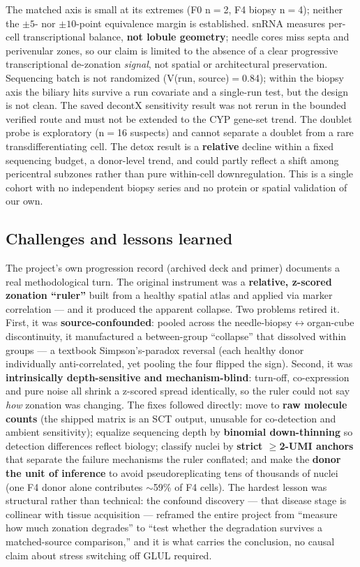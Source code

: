 \documentclass[11pt,a4paper]{article}
\begin{document}
The matched axis is small at its extremes (F0 n$=$2, F4 biopsy n$=$4); neither the $\pm5$- nor $\pm10$-point equivalence margin is established. snRNA measures per-cell transcriptional balance, \textbf{not lobule geometry}; needle cores miss septa and perivenular zones, so our claim is limited to the absence of a clear progressive transcriptional de-zonation \emph{signal}, not spatial or architectural preservation. Sequencing batch is not randomized (V(run, source)$=$0.84); within the biopsy axis the biliary hits survive a run covariate and a single-run test, but the design is not clean. The saved decontX sensitivity result was not rerun in the bounded verified route and must not be extended to the CYP gene-set trend. The doublet probe is exploratory (n$=$16 suspects) and cannot separate a doublet from a rare transdifferentiating cell. The detox result is a \textbf{relative} decline within a fixed sequencing budget, a donor-level trend, and could partly reflect a shift among pericentral subzones rather than pure within-cell downregulation. This is a single cohort with no independent biopsy series and no protein or spatial validation of our own.

\subsection{Challenges and lessons learned}

The project's own progression record (archived deck and primer) documents a real methodological turn. The original instrument was a \textbf{relative, z-scored zonation ``ruler''} built from a healthy spatial atlas and applied via marker correlation --- and it produced the apparent collapse. Two problems retired it. First, it was \textbf{source-confounded}: pooled across the needle-biopsy$\leftrightarrow$organ-cube discontinuity, it manufactured a between-group ``collapse'' that dissolved within groups --- a textbook Simpson's-paradox reversal (each healthy donor individually anti-correlated, yet pooling the four flipped the sign). Second, it was \textbf{intrinsically depth-sensitive and mechanism-blind}: turn-off, co-expression and pure noise all shrink a z-scored spread identically, so the ruler could not say \emph{how} zonation was changing. The fixes followed directly: move to \textbf{raw molecule counts} (the shipped matrix is an SCT output, unusable for co-detection and ambient sensitivity); equalize sequencing depth by \textbf{binomial down-thinning} so detection differences reflect biology; classify nuclei by \textbf{strict $\ge$2-UMI anchors} that separate the failure mechanisms the ruler conflated; and make the \textbf{donor the unit of inference} to avoid pseudoreplicating tens of thousands of nuclei (one F4 donor alone contributes $\sim$59\% of F4 cells). The hardest lesson was structural rather than technical: the confound discovery --- that disease stage is collinear with tissue acquisition --- reframed the entire project from ``measure how much zonation degrades'' to ``test whether the degradation survives a matched-source comparison,'' and it is what carries the conclusion, no causal claim about stress switching off GLUL required.
\end{document}
